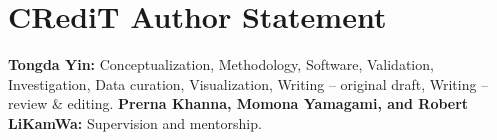 \section*{CRediT Author Statement}
\textbf{Tongda Yin:} Conceptualization, Methodology, Software, Validation,
Investigation, Data curation, Visualization, Writing -- original draft,
Writing -- review \& editing.
\textbf{Prerna Khanna, Momona Yamagami, and Robert LiKamWa:}
Supervision and mentorship.
